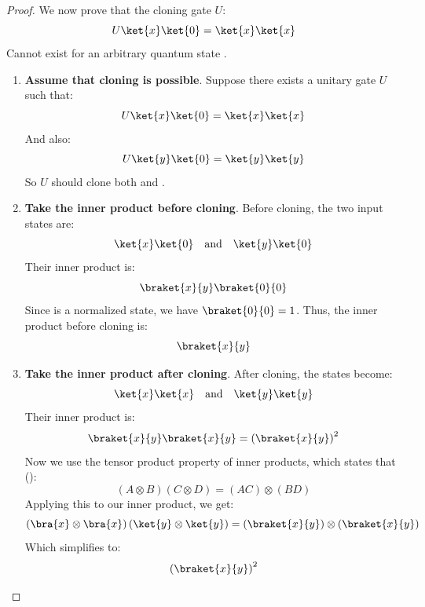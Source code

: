 \begin{proof}
    We now prove that the cloning gate $U$:
    \begin{equation*}
        U \ket{x} \ket{0} = \ket{x} \ket{x}
    \end{equation*}
    Cannot exist for an arbitrary quantum state .
    \begin{enumerate}
        \item \textbf{Assume that cloning is possible}. Suppose there exists a unitary gate $U$ such that:
        \begin{equation*}
            U \ket{x} \ket{0} = \ket{x} \ket{x}
        \end{equation*}
        And also:
        \begin{equation*}
            U \ket{y} \ket{0} = \ket{y} \ket{y}
        \end{equation*}
        So $U$ should clone both  and .

        \item \textbf{Take the inner product before cloning}. Before cloning, the two input states are:
        \begin{equation*}
            \ket{x}\ket{0} \quad \text{and} \quad \ket{y}\ket{0}
        \end{equation*}
        Their inner product is:
        \begin{equation*}
            \braket{x}{y} \braket{0}{0}
        \end{equation*}
        Since  is a normalized state, we have $\braket{0}{0} = 1$. Thus, the inner product before cloning is:
        \begin{equation*}
            \braket{x}{y}
        \end{equation*}

        \item \textbf{Take the inner product after cloning}. After cloning, the states become:
        \begin{equation*}
            \ket{x}\ket{x} \quad \text{and} \quad \ket{y}\ket{y}
        \end{equation*}
        Their inner product is:
        \begin{equation*}
            \braket{x}{y} \braket{x}{y} = \left(\braket{x}{y}\right)^2
        \end{equation*}
        Now we use the tensor product property of inner products, which states that ():
        \begin{equation*}
            \left(A \otimes B\right)\left(C \otimes D\right) = \left(AC\right) \otimes \left(BD\right)
        \end{equation*}
        Applying this to our inner product, we get:
        \begin{equation*}
            \left(\bra{x} \otimes \bra{x}\right) \left(\ket{y} \otimes \ket{y}\right) = \left(\braket{x}{y}\right) \otimes \left(\braket{x}{y}\right)
        \end{equation*}
        Which simplifies to:
        \begin{equation*}
            \left(\braket{x}{y}\right)^2
        \end{equation*}


\end{enumerate}
\end{proof}
